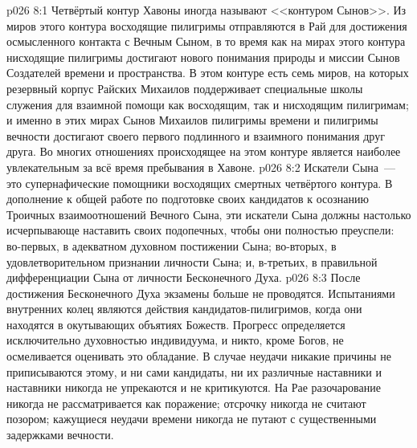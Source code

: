 \vs p026 8:1 Четвёртый контур Хавоны иногда называют <<контуром Сынов>>. Из миров этого контура восходящие пилигримы отправляются в Рай для достижения осмысленного контакта с Вечным Сыном, в то время как на мирах этого контура нисходящие пилигримы достигают нового понимания природы и миссии Сынов Создателей времени и пространства. В этом контуре есть семь миров, на которых резервный корпус Райских Михаилов поддерживает специальные школы служения для взаимной помощи как восходящим, так и нисходящим пилигримам; и именно в этих мирах Сынов Михаилов пилигримы времени и пилигримы вечности достигают своего первого подлинного и взаимного понимания друг друга. Во многих отношениях происходящее на этом контуре является наиболее увлекательным за всё время пребывания в Хавоне.
\vs p026 8:2 Искатели Сына~--- это супернафические помощники восходящих смертных четвёртого контура. В дополнение к общей работе по подготовке своих кандидатов к осознанию Троичных взаимоотношений Вечного Сына, эти искатели Сына должны настолько исчерпывающе наставить своих подопечных, чтобы они полностью преуспели: во\hyp{}первых, в адекватном духовном постижении Сына; во\hyp{}вторых, в удовлетворительном признании личности Сына; и, в\hyp{}третьих, в правильной дифференциации Сына от личности Бесконечного Духа.
\vs p026 8:3 После достижения Бесконечного Духа экзамены больше не проводятся. Испытаниями внутренних колец являются действия кандидатов\hyp{}пилигримов, когда они находятся в окутывающих объятиях Божеств. Прогресс определяется исключительно духовностью индивидуума, и никто, кроме Богов, не осмеливается оценивать это обладание. В случае неудачи никакие причины не приписываются этому, и ни сами кандидаты, ни их различные наставники и наставники никогда не упрекаются и не критикуются. На Рае разочарование никогда не рассматривается как поражение; отсрочку никогда не считают позором; кажущиеся неудачи времени никогда не путают с существенными задержками вечности.
